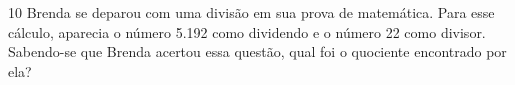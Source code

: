 \num{10} Brenda se deparou com uma divisão em sua prova de matemática. Para esse
cálculo, aparecia o número 5.192 como dividendo e o número 22 como divisor. Sabendo-se que
Brenda acertou essa questão, qual foi o quociente encontrado por ela?

